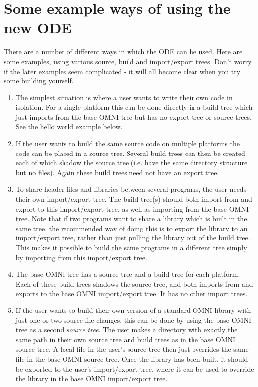 \documentclass[11pt]{article}
\begin{document}
\section{Some example ways of using the new ODE}

There are a number of different ways in which the ODE can be used.  Here are
some examples, using various source, build and import/export trees.  Don't
worry if the later examples seem complicated - it will all become clear when
you try some building yourself.

\begin{enumerate}

\item
\label{buildtreeonly}
The simplest situation is where a user wants to write their own code in
isolation.  For a single platform this can be done directly in a build tree
which just imports from the base OMNI tree but has no export tree or source
trees.  See the hello world example below.

\item If the user wants to build the same source code on multiple platforms the
code can be placed in a source tree.  Several build trees can then be created
each of which shadow the source tree (i.e. have the same directory structure
but no files).  Again these build trees need not have an export tree.

\item
\label{twoimporttrees}
To share header files and libraries between several programs, the user
needs their own import/export tree.  The build tree(s) should both import from
and export to this import/export tree, as well as importing from the base OMNI
tree.  Note that if two programs want to share a library which is built in the
same tree, the recommended way of doing this is to export the library to an
import/export tree, rather than just pulling the library out of the build tree.
This makes it possible to build the same programs in a different tree simply by
importing from this import/export tree.

\item The base OMNI tree has a source tree and a build tree for each platform.
Each of these build trees shadows the source tree, and both imports from and
exports to the base OMNI import/export tree.  It has no other import trees.

\item If the user wants to build their own version of a standard OMNI library
with just one or two source file changes, this can be done by using the base
OMNI tree as a second {\em source tree}.  The user makes a directory with
exactly the same path in their own source tree and build trees as in the base
OMNI source tree.  A local file in the user's source tree then just overrides
the same file in the base OMNI source tree.  Once the library has been built,
it should be exported to the user's import/export tree, where it can be used to
override the library in the base OMNI import/export tree.


\end{enumerate}
\end{document}
